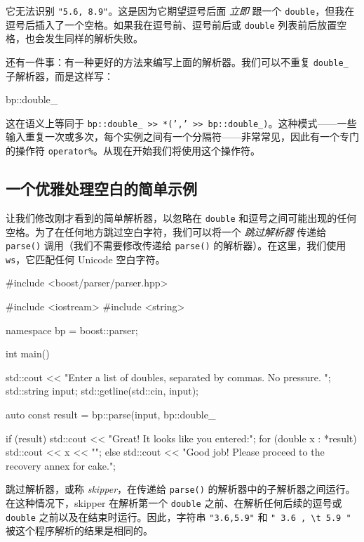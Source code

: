 它无法识别 \texttt{"5.6, 8.9"}。这是因为它期望逗号后面 \emph{立即} 跟一个 \texttt{double}，但我在逗号后插入了一个空格。如果我在逗号前、逗号前后或 \texttt{double} 列表前后放置空格，也会发生同样的解析失败。

还有一件事：有一种更好的方法来编写上面的解析器。我们可以不重复 \texttt{double\_} 子解析器，而是这样写：

\begin{code}
bp::double_ %
\end{code}

这在语义上等同于 \texttt{bp::double\_ >> *(',' >> bp::double\_)}。这种模式——一些输入重复一次或多次，每个实例之间有一个分隔符——非常常见，因此有一个专门的操作符 \texttt{operator\%}。从现在开始我们将使用这个操作符。

\subsection{一个优雅处理空白的简单示例}

让我们修改刚才看到的简单解析器，以忽略在 \texttt{double} 和逗号之间可能出现的任何空格。为了在任何地方跳过空白字符，我们可以将一个 \emph{跳过解析器} 传递给 \texttt{parse()} 调用（我们不需要修改传递给 \texttt{parse()} 的解析器）。在这里，我们使用 \texttt{ws}，它匹配任何 Unicode 空白字符。

\begin{code}
#include <boost/parser/parser.hpp>

#include <iostream>
#include <string>


namespace bp = boost::parser;

int main()
{
    std::cout << "Enter a list of doubles, separated by commas.  No pressure. ";
    std::string input;
    std::getline(std::cin, input);

    auto const result = bp::parse(input, bp::double_ %

    if (result) {
        std::cout << "Great! It looks like you entered:\n";
        for (double x : *result) {
            std::cout << x << "\n";
        }
    } else {
        std::cout
            << "Good job!  Please proceed to the recovery annex for cake.\n";
    }
}
\end{code}

跳过解析器，或称 \emph{skipper}，在传递给 \texttt{parse()} 的解析器中的子解析器之间运行。在这种情况下，skipper 在解析第一个 \texttt{double} 之前、在解析任何后续的逗号或 \texttt{double} 之前以及在结束时运行。因此，字符串 \texttt{"3.6,5.9"} 和 \texttt{" 3.6 , \textbackslash{}t 5.9 "} 被这个程序解析的结果是相同的。

